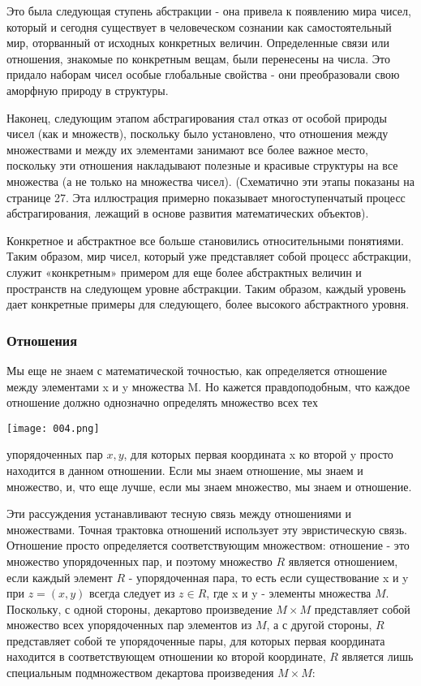 Это была следующая ступень абстракции - она привела к появлению мира чисел, который и сегодня существует в человеческом сознании как самостоятельный мир, оторванный от исходных конкретных величин. Определенные связи или отношения, знакомые по конкретным вещам, были перенесены на числа. Это придало наборам чисел особые глобальные свойства - они преобразовали свою аморфную природу в структуры.

Наконец, следующим этапом абстрагирования стал отказ от особой природы чисел (как и множеств), поскольку было установлено, что отношения между множествами и между их элементами занимают все более важное место, поскольку эти отношения накладывают полезные и красивые структуры на все множества (а не только на множества чисел). (Схематично эти этапы показаны на странице 27. Эта иллюстрация примерно показывает многоступенчатый процесс абстрагирования, лежащий в основе развития математических объектов).

Конкретное и абстрактное все больше становились относительными понятиями. Таким образом, мир чисел, который уже представляет собой процесс абстракции, служит «конкретным» примером для еще более абстрактных величин и пространств на следующем уровне абстракции. Таким образом, каждый уровень дает конкретные примеры для следующего, более высокого абстрактного уровня.

\subsubsection{Отношения}
Мы еще не знаем с математической точностью, как определяется отношение между элементами x и y множества M. Но кажется правдоподобным, что каждое отношение должно однозначно определять множество всех тех
\begin{center}
  \texttt{[image: 004.png]}
\end{center}
\pagebreak
упорядоченных пар \(x,y\), для которых первая координата x ко второй y просто находится в данном отношении. Если мы знаем отношение, мы знаем и множество, и, что еще лучше, если мы знаем множество, мы знаем и отношение.

Эти рассуждения устанавливают тесную связь между отношениями и множествами. Точная трактовка отношений использует эту эвристическую связь. Отношение просто определяется соответствующим множеством: отношение - это множество упорядоченных пар, и поэтому множество \(R\) является отношением, если каждый элемент \(R\) - упорядоченная пара, то есть если существование x и y при \(z =(x,y)\) всегда следует из \(z \in R\), где x и y - элементы множества \(M\).
Поскольку, с одной стороны, декартово произведение \(M \times M\) представляет собой множество всех упорядоченных пар элементов из \(M\), а с другой стороны, \(R\) представляет собой те упорядоченные пары, для которых первая координата находится в соответствующем отношении ко второй координате, \(R\) является лишь специальным подмножеством декартова произведения \(M \times M\):

